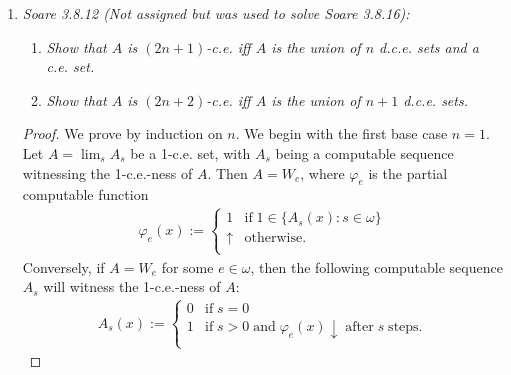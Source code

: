 \documentclass{article}
\begin{document}
\begin{enumerate}[label={\bf Q\arabic*:}]
\begin{enumerate}[label={(\roman*)}]
\begin{proof}
          Then since $\beta$ is countable from (ii), and a countable union of
          countable objects is still countable,
          $\cup_{\alpha<\beta}[D^\alpha(T)]$ is also countable.
        \end{proof}
    \end{enumerate}

  \item \label{q:ce} \it Soare 3.8.12 (Not assigned but was used to solve
    Soare 3.8.16):
    \begin{enumerate}[label={(\roman*)}]
      \item \it Show that $A$ is $(2n+1)$-c.e. iff $A$ is the union of $n$
        d.c.e. sets and a c.e. set.
      \item \it Show that $A$ is $(2n+2)$-c.e. iff $A$ is the union of $n+1$
        d.c.e. sets.
    \end{enumerate}

    \begin{proof}
      We prove by induction on $n$. We begin with the first base case
      $n=1$. Let $A=\lim_s A_s$ be a 1-c.e. set, with $A_s$ being a
      computable sequence witnessing the 1-c.e.-ness of $A$. Then $A=W_e$,
      where $\varphi_e$ is the partial computable function
      \begin{align*}
        \varphi_e(x) :=
        \begin{cases}
          1 &\text{if}\; 1\in\{A_s(x):s\in\omega\}\\
          \uparrow &\text{otherwise}.\\
        \end{cases}
      \end{align*}
      Conversely, if $A=W_e$ for some $e\in\omega$, then the following
      computable sequence $A_s$ will witness the 1-c.e.-ness of $A$:
      \begin{align*}
        A_s(x) :=
        \begin{cases}
          0 &\text{if}\; s=0\\
          1 &\text{if}\; s>0\; \text{and}\; \varphi_e(x)\downarrow\;
          \text{after}\; s\; \text{steps}.\\
        \end{cases}
      \end{align*}


\end{proof}
\end{enumerate}
\end{document}
